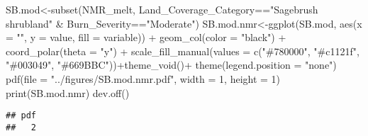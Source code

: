 \documentclass[
]{article}
\newenvironment{Shaded}{\begin{snugshade}}{\end{snugshade}}
\newcommand{\AttributeTok}[1]{\textcolor[rgb]{0.77,0.63,0.00}{#1}}
\newcommand{\DecValTok}[1]{\textcolor[rgb]{0.00,0.00,0.81}{#1}}
\newcommand{\FunctionTok}[1]{\textcolor[rgb]{0.00,0.00,0.00}{#1}}
\newcommand{\NormalTok}[1]{#1}
\newcommand{\OtherTok}[1]{\textcolor[rgb]{0.56,0.35,0.01}{#1}}
\newcommand{\SpecialCharTok}[1]{\textcolor[rgb]{0.00,0.00,0.00}{#1}}
\newcommand{\StringTok}[1]{\textcolor[rgb]{0.31,0.60,0.02}{#1}}
\begin{document}
\begin{Shaded}
\begin{Highlighting}[]
\NormalTok{SB.mod}\OtherTok{\textless{}{-}}\FunctionTok{subset}\NormalTok{(NMR\_melt, Land\_Coverage\_Category}\SpecialCharTok{==}\StringTok{"Sagebrush shrubland"} \SpecialCharTok{\&}\NormalTok{ Burn\_Severity}\SpecialCharTok{==}\StringTok{"Moderate"}\NormalTok{)}
\NormalTok{SB.mod.nmr}\OtherTok{\textless{}{-}}\FunctionTok{ggplot}\NormalTok{(SB.mod, }\FunctionTok{aes}\NormalTok{(}\AttributeTok{x =} \StringTok{""}\NormalTok{, }\AttributeTok{y =}\NormalTok{ value, }\AttributeTok{fill =}\NormalTok{ variable)) }\SpecialCharTok{+}
    \FunctionTok{geom\_col}\NormalTok{(}\AttributeTok{color =} \StringTok{"black"}\NormalTok{) }\SpecialCharTok{+}
    \FunctionTok{coord\_polar}\NormalTok{(}\AttributeTok{theta =} \StringTok{"y"}\NormalTok{) }\SpecialCharTok{+} \FunctionTok{scale\_fill\_manual}\NormalTok{(}\AttributeTok{values =} \FunctionTok{c}\NormalTok{(}\StringTok{"\#780000"}\NormalTok{, }\StringTok{"\#c1121f"}\NormalTok{, }\StringTok{"\#003049"}\NormalTok{, }\StringTok{"\#669BBC"}\NormalTok{))}\SpecialCharTok{+}\FunctionTok{theme\_void}\NormalTok{()}\SpecialCharTok{+}
    \FunctionTok{theme}\NormalTok{(}\AttributeTok{legend.position =} \StringTok{"none"}\NormalTok{)}
\FunctionTok{pdf}\NormalTok{(}\AttributeTok{file =} \StringTok{"../figures/SB.mod.nmr.pdf"}\NormalTok{, }\AttributeTok{width =} \DecValTok{1}\NormalTok{, }\AttributeTok{height =} \DecValTok{1}\NormalTok{) }
\FunctionTok{print}\NormalTok{(SB.mod.nmr)}
\FunctionTok{dev.off}\NormalTok{()}
\end{Highlighting}
\end{Shaded}

\begin{verbatim}
## pdf 
##   2
\end{verbatim}
\end{document}
